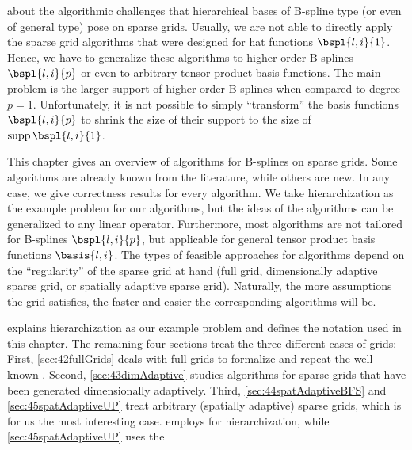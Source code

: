 
\label{chap:40hierarchization}


about the algorithmic challenges
that hierarchical bases of B-spline type (or even of general type) pose
on sparse grids.
Usually, we are not able to directly apply the sparse grid algorithms
that were designed for hat functions $\bspl{l,i}{1}$.
Hence, we have to generalize these algorithms
to higher-order B-splines $\bspl{l,i}{p}$
or even to arbitrary tensor product basis functions.
The main problem is the larger support
of higher-order B-splines when compared to degree $p = 1$.
Unfortunately, it is not possible to simply ``transform'' the basis
functions $\bspl{l,i}{p}$ to shrink the size of their support
to the size of $\supp \bspl{l,i}{1}$.

This chapter gives an overview of algorithms for B-splines
on sparse grids.
Some algorithms are already known from the literature,
while others are new.
In any case, we give correctness results for every algorithm.
We take hierarchization as the example problem for our algorithms,
but the ideas of the algorithms can be generalized to any linear operator.
Furthermore, most algorithms are not tailored for B-splines $\bspl{l,i}{p}$,
but applicable for general tensor product basis functions $\basis{l,i}$.
The types of feasible approaches for algorithms
depend on the ``regularity'' of the sparse grid at hand
(full grid, dimensionally adaptive sparse grid, or
spatially adaptive sparse grid).
Naturally, the more assumptions the grid satisfies, the faster and
easier the corresponding algorithms will be.

 explains hierarchization as our example problem
and defines the notation used in this chapter.
The remaining four sections treat the three different cases of grids:
First, \cref{sec:42fullGrids} deals with full grids to formalize and repeat
the well-known \up. %
Second, \cref{sec:43dimAdaptive} studies algorithms for
sparse grids that have been generated dimensionally adaptively.
Third, \cref{sec:44spatAdaptiveBFS} and \cref{sec:45spatAdaptiveUP}
treat arbitrary (spatially adaptive) sparse grids,
which is for us the most interesting case.
 employs \bfs for hierarchization,
while \cref{sec:45spatAdaptiveUP} uses the \up{}

